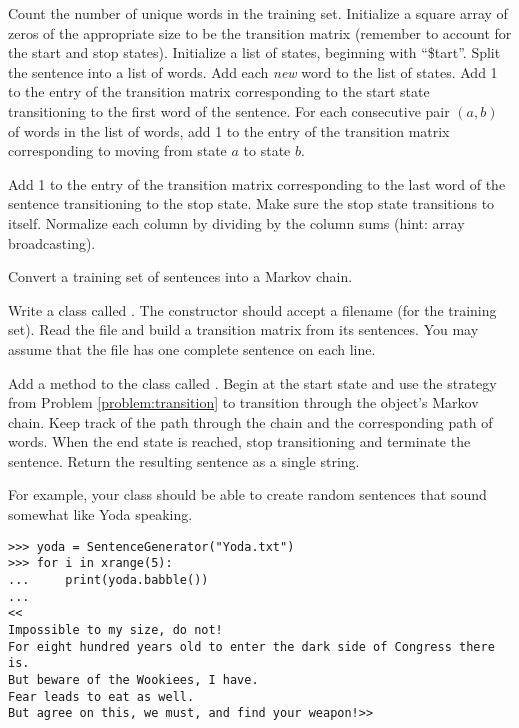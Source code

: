 \begin{algorithm} %
\begin{algorithmic}[1]
\State Count the number of unique words in the training set.
\State Initialize a square array of zeros of the appropriate size to be the transition matrix (remember to account for the start and stop states).
\State Initialize a list of states, beginning with ``\$tart''.
    \State Split the sentence into a list of words.
    \State Add each \emph{new} word to the list of states.
    \State Add 1 to the entry of the transition matrix corresponding to the start state transitioning to the first word of the sentence.
   	\State For each consecutive pair $(a, b)$ of words in the list of words, add 1 to the entry of the transition matrix corresponding to moving from state $a$ to state $b$.
	\item Add 1 to the entry of the transition matrix corresponding to the last word of the sentence transitioning to the stop state.
\EndFor
\State Make sure the stop state transitions to itself.
\State Normalize each column by dividing by the column sums (hint: array broadcasting).
\EndProcedure
\end{algorithmic}
\caption{Convert a training set of sentences into a Markov chain.}
\label{alg:MarkovSentencesTransitionMatrix}
\end{algorithm}

\begin{problem} %
Write a class called .
The constructor should accept a filename (for the training set).
Read the file and build a transition matrix from its sentences.
You may assume that the file has one complete sentence on each line.
\label{problem:MarkovClassPt1}
\end{problem}


\begin{problem} %
Add a method to the  class called .
Begin at the start state and use the strategy from Problem \ref{problem:transition} to transition through the object's Markov chain.
Keep track of the path through the chain and the corresponding path of words.
When the end state is reached, stop transitioning and terminate the sentence.
Return the resulting sentence as a single string.

For example, your  class should be able to create random sentences that sound somewhat like Yoda speaking.
\begin{lstlisting}
>>> yoda = SentenceGenerator("Yoda.txt")
>>> for i in xrange(5):
... 	print(yoda.babble())
...
<<
Impossible to my size, do not!
For eight hundred years old to enter the dark side of Congress there is.
But beware of the Wookiees, I have.
Fear leads to eat as well.
But agree on this, we must, and find your weapon!>>
\end{lstlisting}
\end{problem}

